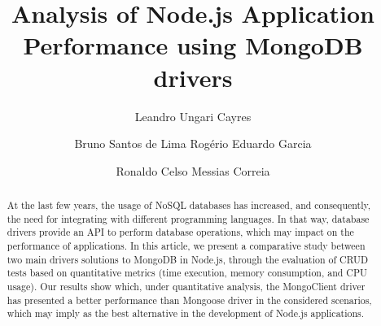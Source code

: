 \documentclass{svproc}
\begin{document}
\mainmatter              %
%
\title{Analysis of Node.js Application Performance using MongoDB drivers}
%
%
\author{Leandro Ungari Cayres \and Bruno Santos de Lima Rogério Eduardo Garcia \and Ronaldo Celso Messias Correia}
%
%
%
\institute{Faculty of Science and Technology -- São Paulo State University (UNESP), Presidente Prudente -- SP, Brazil,\\
\email{\{leandro.ungari,bruno.s.lima,rogerio.garcia,ronaldo.correia\}@unesp.br}
}

\maketitle %

\begin{abstract}
At the last few years, the usage of NoSQL databases has increased, and consequently, the need for integrating with different programming languages. In that way, database drivers provide an API to perform database operations, which may impact on the performance of applications. In this article, we present a comparative study between two main drivers solutions to MongoDB in Node.js, through the evaluation of CRUD tests based on quantitative metrics (time execution, memory consumption, and CPU usage). Our results show which, under quantitative analysis, the MongoClient driver has presented a better performance than Mongoose driver in the considered scenarios, which may imply as the best alternative in the development of Node.js applications.
\end{abstract}
%
\end{document}
